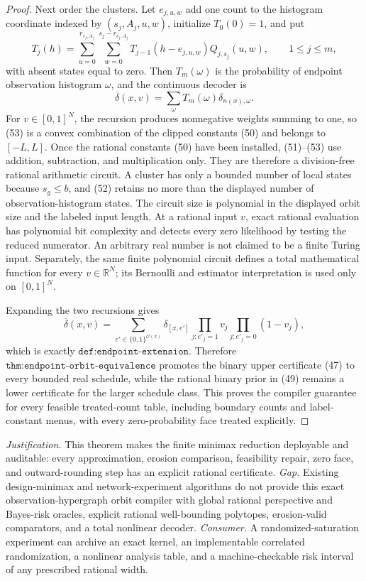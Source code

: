\documentclass{article}
\begin{document}
\begin{proof}
Next order the clusters.  Let \(e_{j,u,w}\) add one count to the histogram coordinate indexed by \((s_j,A_j,u,w)\), initialize \(T_0(0)=1\), and put
\[
 T_j(h)=
 \sum_{u=0}^{r_{s_j,A_j}}
 \sum_{w=0}^{s_j-r_{s_j,A_j}}
 T_{j-1}(h-e_{j,u,w})Q_{j,s_j}(u,w),
 \qquad 1\le j\le m,
\tag{52}
\]
with absent states equal to zero.  Then \(T_m(\omega)\) is the probability of endpoint observation histogram \(\omega\), and the continuous decoder is
\[
 \overline\delta(x,v)=
 \sum_\omega T_m(\omega)\delta_{n(x),\omega}.
\tag{53}
\]
For \(v\in[0,1]^N\), the recursion produces nonnegative weights summing to one, so (53) is a convex combination of the clipped constants (50) and belongs to \([-L,L]\).  Once the rational constants (50) have been installed, (51)--(53) use addition, subtraction, and multiplication only.  They are therefore a division-free rational arithmetic circuit.  A cluster has only a bounded number of local states because \(s_g\le b\), and (52) retains no more than the displayed number of observation-histogram states.  The circuit size is polynomial in the displayed orbit size and the labeled input length.  At a rational input \(v\), exact rational evaluation has polynomial bit complexity and detects every zero likelihood by testing the reduced numerator.  An arbitrary real number is not claimed to be a finite Turing input.  Separately, the same finite polynomial circuit defines a total mathematical function for every \(v\in\mathbb R^N\); its Bernoulli and estimator interpretation is used only on \([0,1]^N\).

Expanding the two recursions gives
\[
 \overline\delta(x,v)=
 \sum_{e'\in\{0,1\}^{\mathcal O(x)}}
 \delta_{[x,e']}
 \prod_{j:e'_j=1}v_j
 \prod_{j:e'_j=0}(1-v_j),
\tag{54}
\]
which is exactly \(\texttt{def:endpoint-extension}\).  Therefore \(\texttt{thm:endpoint-orbit-equivalence}\) promotes the binary upper certificate (47) to every bounded real schedule, while the rational binary prior in (49) remains a lower certificate for the larger schedule class.  This proves the compiler guarantee for every feasible treated-count table, including boundary counts and label-constant menus, with every zero-probability face treated explicitly.
\end{proof}
\par\smallskip\noindent \textit{Justification.} This theorem makes the finite minimax reduction deployable and auditable: every approximation, erosion comparison, feasibility repair, zero face, and outward-rounding step has an explicit rational certificate. \textit{Gap.} Existing design-minimax and network-experiment algorithms do not provide this exact observation-hypergraph orbit compiler with global rational perspective and Bayes-risk oracles, explicit rational well-bounding polytopes, erosion-valid comparators, and a total nonlinear decoder. \textit{Consumer.} A randomized-saturation experiment can archive an exact kernel, an implementable correlated randomization, a nonlinear analysis table, and a machine-checkable risk interval of any prescribed rational width.
\end{document}
